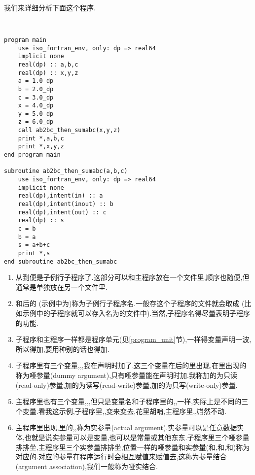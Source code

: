 我们来详细分析下面这个程序.
\begin{lstlisting}


program main
    use iso_fortran_env, only: dp => real64
    implicit none
    real(dp) :: a,b,c
    real(dp) :: x,y,z
    a = 1.0_dp
    b = 2.0_dp
    c = 3.0_dp
    x = 4.0_dp
    y = 5.0_dp
    z = 6.0_dp
    call ab2bc_then_sumabc(x,y,z)
    print *,a,b,c
    print *,x,y,z
end program main

subroutine ab2bc_then_sumabc(a,b,c)
    use iso_fortran_env, only: dp => real64
    implicit none
    real(dp),intent(in) :: a
    real(dp),intent(inout) :: b
    real(dp),intent(out) :: c
    real(dp) :: s
    c = b
    b = a
    s = a+b+c
    print *,s
end subroutine ab2bc_then_sumabc
\end{lstlisting}
\begin{enumerate}
    \item 从到便是子例行子程序了.这部分可以和主程序放在一个文件里,顺序也随便,但通常是单独放在另一个文件里.
    \item {}和后的 (示例中为)称为子例行子程序名.一般存这个子程序的文件就会取成 (比如示例中的子程序就可以存入名为的文件中).当然,子程序名得尽量表明子程序的功能.
    \item 子程序和主程序一样都是程序单元(见\ref{program_unit}节),一样得变量声明一波,所以得加,要用种别的话也得加.
    \item 子程序里有三个变量,,,我在声明时加了,这三个变量在后的\ttt{()}里出现,在\ttt{()}里出现的称为哑参量(dummy argument),只有哑参量能在声明时加.我称加的为只读(read-only)参量,加的为读写(read-write)参量,加的为只写(write-only)参量.
    \item 主程序里也有三个变量,,,但只是变量名和子程序里的,,一样,实际上是不同的三个变量.看我这示例,子程序里,,变来变去,花里胡哨,主程序里,,岿然不动.
    \item 主程序里出现,\ttt{()}里的,,称为实参量(actual argument).实参量可以是任意数据实体,也就是说实参量可以是变量,也可以是常量或其他东东.子程序里三个哑参量排排坐,主程序里三个实参量排排坐,位置一样的哑参量和实参量(和,和,和)称为对应的.对应的参量在程序运行时会相互赋值来赋值去,这称为参量结合(argument association),我们一般称为哑实结合.

\end{enumerate}
